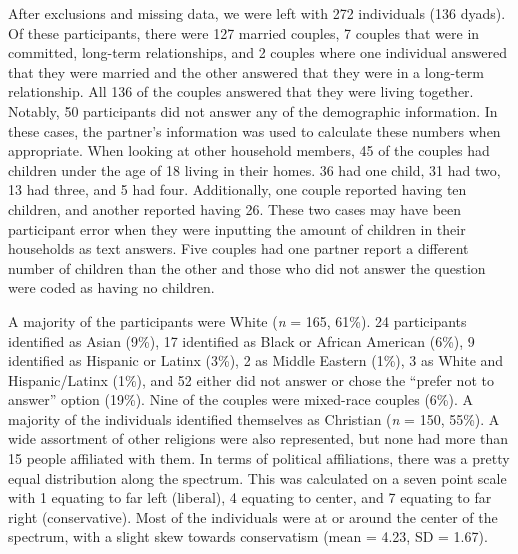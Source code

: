 \documentclass[
  english,
  man]{apa6}
\begin{document}
After exclusions and missing data, we were left with 272 individuals (136 dyads). Of these participants, there were 127 married couples, 7 couples that were in committed, long-term relationships, and 2 couples where one individual answered that they were married and the other answered that they were in a long-term relationship. All 136 of the couples answered that they were living together. Notably, 50 participants did not answer any of the demographic information. In these cases, the partner's information was used to calculate these numbers when appropriate. When looking at other household members, 45 of the couples had children under the age of 18 living in their homes. 36 had one child, 31 had two, 13 had three, and 5 had four. Additionally, one couple reported having ten children, and another reported having 26. These two cases may have been participant error when they were inputting the amount of children in their households as text answers. Five couples had one partner report a different number of children than the other and those who did not answer the question were coded as having no children.

A majority of the participants were White (\emph{n} = 165, 61\%). 24 participants identified as Asian (9\%), 17 identified as Black or African American (6\%), 9 identified as Hispanic or Latinx (3\%), 2 as Middle Eastern (1\%), 3 as White and Hispanic/Latinx (1\%), and 52 either did not answer or chose the \enquote{prefer not to answer} option (19\%). Nine of the couples were mixed-race couples (6\%). A majority of the individuals identified themselves as Christian (\emph{n} = 150, 55\%). A wide assortment of other religions were also represented, but none had more than 15 people affiliated with them. In terms of political affiliations, there was a pretty equal distribution along the spectrum. This was calculated on a seven point scale with 1 equating to far left (liberal), 4 equating to center, and 7 equating to far right (conservative). Most of the individuals were at or around the center of the spectrum, with a slight skew towards conservatism (mean = 4.23, SD = 1.67).
\end{document}
